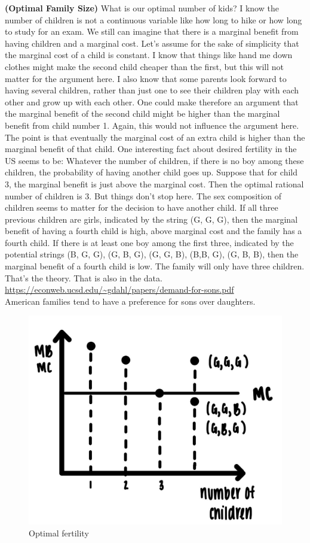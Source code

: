 \documentclass[
]{book}
\begin{document}
\textbf{(Optimal Family Size)} What is our optimal number of kids? I know the number of children is not a continuous variable like how long to hike or how long to study for an exam. We still can imagine that there is a marginal benefit from having children and a marginal cost. Let's assume for the sake of simplicity that the marginal cost of a child is constant. I know that things like hand me down clothes might make the second child cheaper than the first, but this will not matter for the argument here. I also know that some parents look forward to having several children, rather than just one to see their children play with each other and grow up with each other. One could make therefore an argument that the marginal benefit of the second child might be higher than the marginal benefit from child number 1. Again, this would not influence the argument here. The point is that eventually the marginal cost of an extra child is higher than the marginal benefit of that child.
One interesting fact about desired fertility in the US seems to be: Whatever the number of children, if there is no boy among these children, the probability of having another child goes up. Suppose that for child 3, the marginal benefit is just above the marginal cost. Then the optimal rational number of children is 3. But things don't stop here. The sex composition of children seems to matter for the decision to have another child. If all three previous children are girls, indicated by the string (G, G, G), then the marginal benefit of having a fourth child is high, above marginal cost and the family has a fourth child. If there is at least one boy among the first three, indicated by the potential strings (B, G, G), (G, B, G), (G, G, B), (B,B, G), (G, B, B), then the marginal benefit of a fourth child is low. The family will only have three children.
That's the theory. That is also in the data. \url{https://econweb.ucsd.edu/~gdahl/papers/demand-for-sons.pdf}\\
American families tend to have a preference for sons over daughters.

\begin{figure}

{\centering \includegraphics[width=0.5\linewidth]{img/rationalchoice/fig8} 

}

\caption{Optimal fertility}\label{fig:rationalchoice08}
\end{figure}
\end{document}
